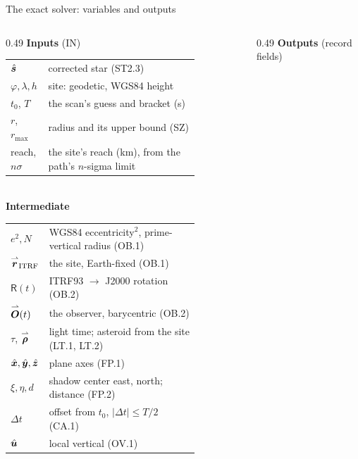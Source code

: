 \begin{frame}{The exact solver: variables and outputs}
  \scriptsize
  \renewcommand{\arraystretch}{1.02}
  \begin{columns}[T]
    \begin{column}{0.49\textwidth}
      \textbf{Inputs} (IN)\\[0.3ex]
      \begin{tabular}{@{}l >{\raggedright\arraybackslash}p{0.80\linewidth}@{}}
        $\hat{\bm{s}}$ & corrected star (ST2.3) \\
        $\varphi, \lambda, h$ & site: geodetic, WGS84 height \\
        $t_0$, $T$ & the scan's guess and bracket (s) \\
        $r$, $r_{\max}$ & radius and its upper bound (SZ) \\
        reach, $n\sigma$ & the site's reach (km), from the path's $n$-sigma limit \\
      \end{tabular}\\[0.6ex]
      \textbf{Intermediate}\\[0.3ex]
      \begin{tabular}{@{}l >{\raggedright\arraybackslash}p{0.80\linewidth}@{}}
        $e^2, N$ & WGS84 eccentricity$^2$, prime-vertical radius (OB.1) \\
        $\overset{\rightharpoonup}{\bm{r}}_{\mathrm{ITRF}}$ & the site, Earth-fixed (OB.1) \\
        $\mathsf{R}(t)$ & ITRF93 $\to$ J2000 rotation (OB.2) \\
        $\overset{\rightharpoonup}{\bm{O}}(t)$ & the observer, barycentric (OB.2) \\
        $\tau$, $\overset{\rightharpoonup}{\bm{\rho}}$ & light time; asteroid from the site (LT.1, LT.2) \\
        $\hat{\bm{x}}, \hat{\bm{y}}, \hat{\bm{z}}$ & plane axes (FP.1) \\
        $\xi, \eta, d$ & shadow center east, north; distance (FP.2) \\
        $\Delta t$ & offset from $t_0$, $|\Delta t| \le T/2$ (CA.1) \\
        $\hat{\bm{u}}$ & local vertical (OV.1) \\
      \end{tabular}
    \end{column}
    \begin{column}{0.49\textwidth}
      \textbf{Outputs} {\tiny(record fields)}\\[0.3ex]

\end{column}
\end{columns}
\end{frame}
